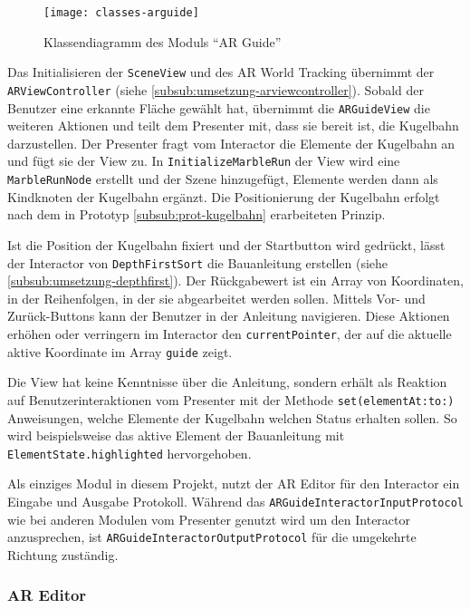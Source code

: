 \begin{figure}[htb!]
	\centering
	\texttt{[image: classes-arguide]}%
	\caption{Klassendiagramm des Moduls "`AR Guide"'}%
	\label{fig:classes-arguide}%
\end{figure}

Das Initialisieren der \texttt{SceneView} und des AR World Tracking übernimmt der \texttt{ARViewController} (siehe \ref{subsub:umsetzung-arviewcontroller}).
Sobald der Benutzer eine erkannte Fläche gewählt hat, übernimmt die \texttt{ARGuideView} die weiteren Aktionen und teilt dem Presenter mit, dass sie bereit ist, die Kugelbahn darzustellen.
Der Presenter fragt vom Interactor die Elemente der Kugelbahn an und fügt sie der View zu.
In \texttt{InitializeMarbleRun} der View wird eine \texttt{MarbleRunNode} erstellt und der Szene hinzugefügt, Elemente werden dann als Kindknoten der Kugelbahn ergänzt.
Die Positionierung der Kugelbahn erfolgt nach dem in Prototyp \ref{subsub:prot-kugelbahn} erarbeiteten Prinzip.

Ist die Position der Kugelbahn fixiert und der Startbutton wird gedrückt, lässt der Interactor von \texttt{DepthFirstSort} die Bauanleitung erstellen (siehe \ref{subsub:umsetzung-depthfirst}).
Der Rückgabewert ist ein Array von Koordinaten, in der Reihenfolgen, in der sie abgearbeitet werden sollen.
Mittels Vor- und Zurück-Buttons kann der Benutzer in der Anleitung navigieren.
Diese Aktionen erhöhen oder verringern im Interactor den \texttt{currentPointer}, der auf die aktuelle aktive Koordinate im Array \texttt{guide} zeigt.

Die View hat keine Kenntnisse über die Anleitung, sondern erhält als Reaktion auf Benutzerinteraktionen vom Presenter mit der Methode \texttt{set(elementAt:to:)} Anweisungen, welche Elemente der Kugelbahn welchen Status erhalten sollen.
So wird beispielsweise das aktive Element der Bauanleitung mit \texttt{ElementState.highlighted} hervorgehoben.

Als einziges Modul in diesem Projekt, nutzt der AR Editor für den Interactor ein Eingabe und Ausgabe Protokoll.
Während das \texttt{ARGuideInteractorInputProtocol} wie bei anderen Modulen vom Presenter genutzt wird um den Interactor anzusprechen, ist \texttt{ARGuideInteractorOutputProtocol} für die umgekehrte Richtung zuständig.


\subsubsection{AR Editor} \label{subsub:umsetzung-modul-areditor}

